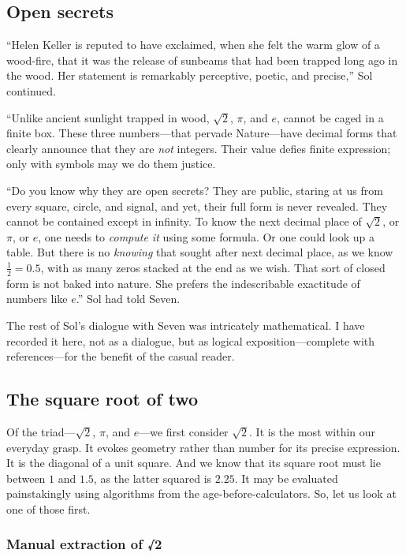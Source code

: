 \documentclass[
  a4paper,
]{article}
\begin{document}
\subsection{Open secrets}\label{open-secrets}

``Helen Keller is reputed to have exclaimed, when she felt the warm glow
of a wood-fire, that it was the release of sunbeams that had been
trapped long ago in the wood. Her statement is remarkably perceptive,
poetic, and precise,'' Sol continued.

``Unlike ancient sunlight trapped in wood, \(\sqrt{2}\), \(\pi\), and
\(e\), cannot be caged in a finite box. These three numbers---that
pervade Nature---have decimal forms that clearly announce that they are
\emph{not} integers. Their value defies finite expression; only with
symbols may we do them justice.

``Do you know why they are open secrets? They are public, staring at us
from every square, circle, and signal, and yet, their full form is never
revealed. They cannot be contained except in infinity. To know the next
decimal place of \(\sqrt{2}\), or \(\pi\), or \(e\), one needs to
\emph{compute it} using some formula. Or one could look up a table. But
there is no \emph{knowing} that sought after next decimal place, as we
know \(\frac{1}{2} = 0.5\), with as many zeros stacked at the end as we
wish. That sort of closed form is not baked into nature. She prefers the
indescribable exactitude of numbers like \(e\).'' Sol had told Seven.

The rest of Sol's dialogue with Seven was intricately mathematical. I
have recorded it here, not as a dialogue, but as logical
exposition---complete with references---for the benefit of the casual
reader.

\subsection{The square root of two}\label{the-square-root-of-two}

Of the triad---\(\sqrt{2}\), \(\pi\), and \(e\)---we first consider
\(\sqrt{2}\). It is the most within our everyday grasp. It evokes
geometry rather than number for its precise expression. It is the
diagonal of a unit square. And we know that its square root must lie
between \(1\) and \(1.5\), as the latter squared is \(2.25\). It may be
evaluated painstakingly using algorithms from the
age-before-calculators. So, let us look at one of those first.

\subsubsection{Manual extraction of √2}\label{manual-extraction-of-2}
\end{document}
